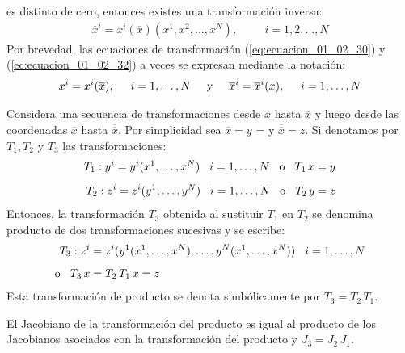 \documentclass[hidelinks,12pt]{article}
\begin{document}
es distinto de cero, entonces existes una transformación inversa:
\begin{align}
\overline{x}^{i} = x^{i} (\overline{x}) (x^{1}, x^{2}, \ldots, x^{N}), \hspace{1cm} i = 1, 2, \ldots, N
\label{ec:ecuacion_01_02_32}
\end{align}
Por brevedad, las ecuaciones de transformación (\ref{eq:ecuacion_01_02_30}) y (\ref{ec:ecuacion_01_02_32}) a veces se expresan mediante la notación:
\begin{align}
x^{i} = x^{i} (\overline{x}), \hspace{0.5cm} i = 1, \ldots, N \hspace{0.5cm} \text{y} \hspace{0.5cm} \overline{x}^{i} = \overline{x}^{i} (x), \hspace{0.5cm} i = 1, \ldots, N
\label{eq:ecuacion_01_02_33}
\end{align}

Considera una secuencia de transformaciones desde $x$ hasta $\overline{x}$ y luego desde las coordenadas $\overline{x}$ hasta $\overline{\overline{x}}$. Por simplicidad sea $\overline{x} = y$ = y $\overline{\overline{x}} = z$. Si denotamos por $T_{1}, T_{2}$ y $T_{3}$ las transformaciones:
\begin{align*}
T_{1}: y^{i} = y^{i} (x^{1}, \ldots, x^{N}) \hspace{0.3cm} i = 1, \ldots, N \hspace{0.3cm} \text{o} \hspace{0.3cm} T_{1} \, x = y \\[0.5em]
T_{2}: z^{i} = z^{i} (y^{1}, \ldots, y^{N}) \hspace{0.3cm} i = 1, \ldots, N \hspace{0.3cm} \text{o} \hspace{0.3cm} T_{2} \, y = z
\end{align*}
Entonces, la transformación $T_{3}$ obtenida al sustituir $T_{1}$ en $T_{2}$ se denomina producto de dos transformaciones sucesivas y se escribe:
\begin{align*}
T_{3}: z^{i} &= z^{i} (y^{1} (x^{1}, \ldots, x^{N}), \ldots, y^{N} (x^{1}, \ldots, x^{N})) \hspace{0.3cm} i = 1, \ldots, N \\[0.5em]
\text{o} \hspace{0.3cm} T_{3} \, x &= T_{2} \, T_{1} \, x = z
\end{align*}
Esta transformación de producto se denota simbólicamente por $T_{3} = T_{2} \, T_{1}$.
\par
El Jacobiano de la transformación del producto es igual al producto de los Jacobianos asociados con la transformación del producto y $J_{3} = J_{2} \, J_{1}$.
\end{document}
